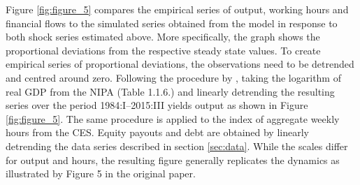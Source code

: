 Figure \ref{fig:figure_5} compares the empirical series of output, working hours and financial flows to the simulated series obtained from the model in response to both shock series estimated above. More specifically, the graph shows the proportional deviations from the respective steady state values. To create empirical series of proportional deviations, the observations need to be detrended and centred around zero. Following the procedure by \citeauthor{JERMANNfinancial}, taking the logarithm of real GDP from the NIPA (Table 1.1.6.) and linearly detrending the resulting series over the period 1984:I--2015:III yields output as shown in Figure \ref{fig:figure_5}. The same procedure is applied to the index of aggregate weekly hours from the CES. Equity payouts and debt are obtained by linearly detrending the data series described in section \ref{sec:data}. While the scales differ for output and hours, the resulting figure generally replicates the dynamics as illustrated by Figure 5 in the original paper.
